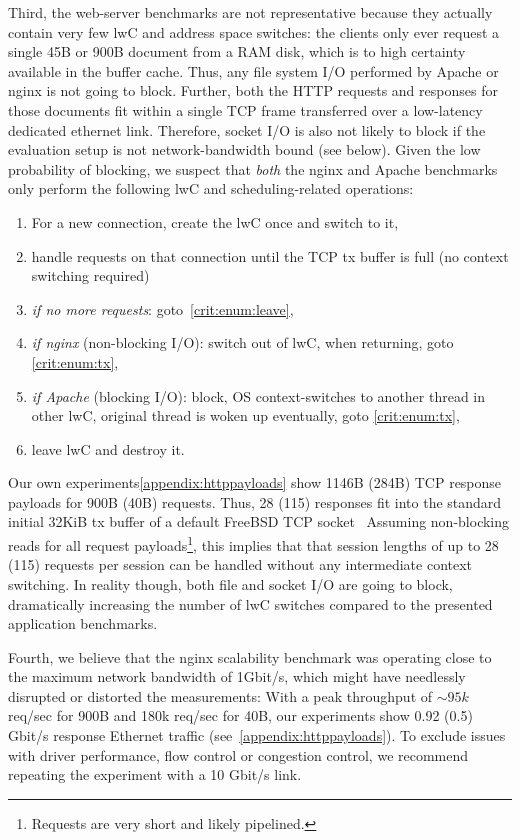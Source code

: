 \documentclass[10pt,twocolumn,a4paper]{article}
\begin{document}
Third, the web-server benchmarks are not representative because they actually contain very few lwC and address space switches:
the clients only ever request a single 45B or 900B document from a RAM disk, which is to high certainty available in the buffer cache.
Thus, any file system I/O performed by Apache or nginx is not going to block.
Further, both the HTTP requests and responses for those documents fit within a single TCP frame transferred over a low-latency dedicated ethernet link.
Therefore, socket I/O is also not likely to block if the evaluation setup is not network-bandwidth bound (see below).
Given the low probability of blocking, we suspect that \textit{both} the nginx and Apache benchmarks only perform the following lwC and scheduling-related operations:
\begin{enumerate}[nosep]
\item For a new connection, create the lwC once and switch to it,
\item\label{crit:enum:tx} handle requests on that connection until the TCP tx buffer is full (no context switching required)
\item \textit{if no more requests}: goto~\ref{crit:enum:leave},
\item \textit{if nginx} (non-blocking I/O): switch out of lwC, when returning, goto \ref{crit:enum:tx},
\item \textit{if Apache} (blocking I/O): block, OS context-switches to another thread in other lwC, original thread is woken up eventually, goto \ref{crit:enum:tx},
\item\label{crit:enum:leave} leave lwC and destroy it.
\end{enumerate}
Our own experiments\ref{appendix:httppayloads} show 1146B (284B) TCP response payloads for 900B (40B) requests.
Thus, 28 (115) responses fit into the standard initial 32KiB tx buffer of a default FreeBSD TCP socket~\cite{fbsd11tcpsendspace}
Assuming non-blocking reads for all request payloads\footnote{Requests are very short and likely pipelined.}, this implies that that session lengths of up to 28 (115) requests per session can be handled without any intermediate context switching.
In reality though, both file and socket I/O are going to block, dramatically increasing the number of lwC switches compared to the presented application benchmarks.

Fourth, we believe that the nginx scalability benchmark was operating close to the maximum network bandwidth of 1Gbit/s, which might have needlessly disrupted or distorted the measurements:
With a peak throughput of $\sim95k$ req/sec for 900B and 180k req/sec for 40B, our experiments show 0.92 (0.5) Gbit/s response Ethernet traffic (see~\ref{appendix:httppayloads}).
To exclude issues with driver performance, flow control or congestion control, we recommend repeating the experiment with a 10 Gbit/s link.
\end{document}
